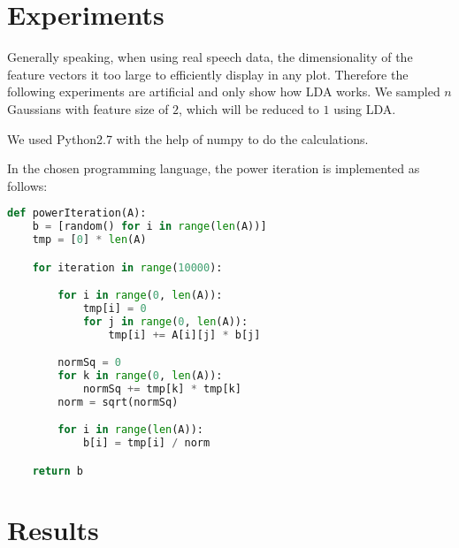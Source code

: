 \section{Experiments}

Generally speaking, when using real speech data, the dimensionality of the feature vectors it too large to efficiently display in any plot.
Therefore the following experiments are artificial and only show how LDA works. We sampled $n$ Gaussians with feature size of $2$, which will be reduced to $1$ using LDA.

We used Python2.7 with the help of numpy to do the calculations.

In the chosen programming language, the power iteration is implemented as follows:
\begin{lstlisting}[language=python]
def powerIteration(A):
    b = [random() for i in range(len(A))]
    tmp = [0] * len(A)

    for iteration in range(10000):

        for i in range(0, len(A)):
            tmp[i] = 0
            for j in range(0, len(A)):
                tmp[i] += A[i][j] * b[j]

        normSq = 0
        for k in range(0, len(A)):
            normSq += tmp[k] * tmp[k]
        norm = sqrt(normSq)

        for i in range(len(A)):
            b[i] = tmp[i] / norm

    return b
\end{lstlisting}

\section{Results}